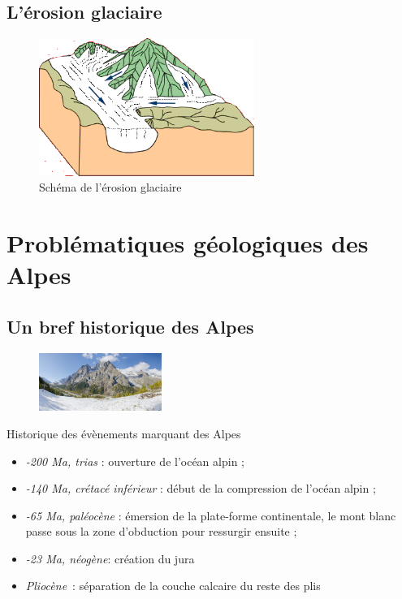 \documentclass{beamer}
\begin{document}
\subsection{L'érosion glaciaire}
\begin{frame}
  \begin{center}
    \begin{figure}
      \includegraphics[width=7cm]{Images/Diapos/Erosion/Glaciaire/Erosion_glaciaire_Bourque4B.png}
      \caption{Schéma de l'érosion glaciaire}
    \end{figure}
  \end{center}
\end{frame}

\section{Problématiques géologiques des Alpes}

\subsection{Un bref historique des Alpes}
\begin{frame}
	\begin{center}
		\begin{figure}
			\includegraphics[width=4cm]{Images/Images_Alexis/mont_blanc.jpg}
		\end{figure}

		Historique des évènements marquant des Alpes
		\begin{itemize}
		 \item \textit{-200 Ma, trias} : ouverture de l’océan alpin ;
		 \item \textit{-140 Ma, crétacé inférieur} : début de la compression de l’océan alpin ;
		 \item \textit{-65 Ma, paléocène} : émersion de la plate-forme continentale, le mont blanc passe sous la zone d'obduction pour ressurgir ensuite ;
		 \item \textit{-23 Ma, néogène}: création du jura
		 \item \textit{Pliocène} : séparation de la couche calcaire du reste des plis
		\end{itemize}
	\end{center}
\end{frame}
\end{document}
